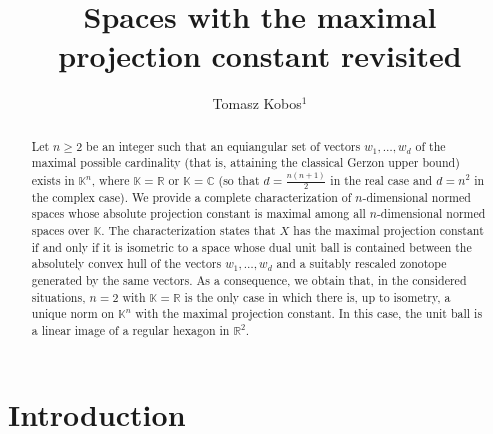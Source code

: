 \documentclass[12pt, reqno]{amsart}
\theoremstyle{definition}
\theoremstyle{remark}
\numberwithin{equation}{section}
\begin{document}
\setcounter{page}{1}

\title{Spaces with the maximal projection constant revisited}
\author[T. Kobos]
{Tomasz Kobos$^1$}
\address{$^1$Faculty of Mathematics and Computer Science, Jagiellonian University, \L ojasiewicza 6, 30-348 Krak\'ow, Poland}

\begin{abstract}
Let $n \geq 2$ be an integer such that an equiangular set of vectors $w_1, \ldots, w_d$ of the maximal possible cardinality (that is, attaining the classical Gerzon upper bound) exists in $\mathbb{K}^n$, where $\mathbb{K}=\mathbb{R}$ or $\mathbb{K}=\mathbb{C}$ (so that $d=\frac{n(n+1)}{2}$ in the real case and $d=n^2$ in the complex case). We provide a complete characterization of $n$-dimensional normed spaces whose absolute projection constant is maximal among all $n$-dimensional normed spaces over $\mathbb{K}$. The characterization states that $X$ has the maximal projection constant if and only if it is isometric to a space whose dual unit ball is contained between the absolutely convex hull of the vectors $w_1, \ldots, w_d$ and a suitably rescaled zonotope generated by the same vectors. As a consequence, we obtain that, in the considered situations, $n=2$ with $\mathbb{K}=\mathbb{R}$ is the only case in which there is, up to isometry, a unique norm on $\mathbb{K}^n$ with the maximal projection constant. In this case, the unit ball is a linear image of a regular hexagon in $\mathbb{R}^2$.
\end{abstract} 
\maketitle

\section{Introduction}
\end{document}
